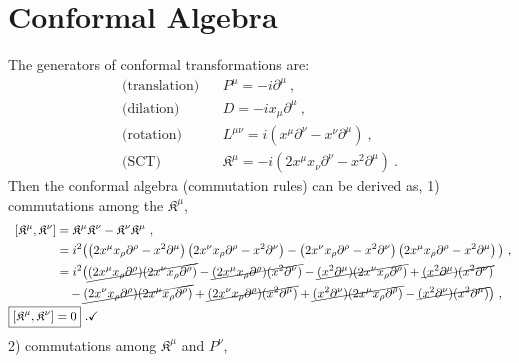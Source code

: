 \documentclass[12pt,a4paper]{report}
\begin{document}
\section{Conformal Algebra}
The generators of conformal transformations are:
\begin{align*}
    \text{(translation)}~~~~&P^{{\mu}}=-i\partial^{{\mu}}~,\\
    \text{(dilation)}~~~~&D=-ix_{{\mu}}\partial^{{\mu}}~,\\
    \text{(rotation)}~~~~&L^{{\mu}{\nu}}=i\left(x^{{\mu}}\partial^{{\nu}}-x^{{\nu}}\partial^{{\mu}}\right)~,\\
    \text{(SCT)}~~~~&\mathfrak{K}^{{\mu}}=-i\left(2x^{{\mu}}x_{{\nu}}\partial^{{\nu}}-x^2\partial^{{\mu}}\right)~.
\end{align*}
Then the conformal algebra (commutation rules) \cite{Antonin, Ralph, Francesco} can be derived as,
1) commutations among the $\mathfrak{K}^{{\mu}}$,
\begin{align*}
    \left[\mathfrak{K}^{{\mu}},\mathfrak{K}^{{\nu}}\right]&=\mathfrak{K}^{{\mu}}\mathfrak{K}^{{\nu}}-\mathfrak{K}^{{\nu}}\mathfrak{K}^{{\mu}}~,\\
    &=i^2\bigl(\left(2x^{{\mu}}x_{{\rho}}\partial^{{\rho}}-x^2\partial^{{\mu}}\right)\left(2x^{{\nu}}x_{{\rho}}\partial^{{\rho}}-x^2\partial^{{\nu}}\right)-\left(2x^{{\nu}}x_{{\rho}}\partial^{{\rho}}-x^2\partial^{{\nu}}\right)\left(2x^{{\mu}}x_{{\rho}}\partial^{{\rho}}-x^2\partial^{{\mu}}\right)\bigl)~,\\
    &=i^2\bigl(\cancel{(2x^{{\mu}}x_{{\rho}}\partial^{{\rho}})(2x^{{\nu}}x_{{\rho}}\partial^{{\rho}})}-\cancel{(2x^{{\mu}}x_{{\rho}}\partial^{{\rho}})(x^2\partial^{{\nu}})}-\cancel{(x^2\partial^{{\mu}})(2x^{{\nu}}x_{{\rho}}\partial^{{\rho}})}+\cancel{(x^2\partial^{{\mu}})(x^2\partial^{{\nu}})}\nonumber\\
    &~~~-\cancel{(2x^{{\nu}}x_{{\rho}}\partial^{{\rho}})(2x^{{\mu}}x_{{\rho}}\partial^{{\rho}})}+\cancel{(2x^{{\nu}}x_{{\rho}}\partial^{{\rho}})(x^2\partial^{{\mu}})}+\cancel{(x^2\partial^{{\nu}})(2x^{{\mu}}x_{{\rho}}\partial^{{\rho}})}-\cancel{(x^2\partial^{{\nu}})(x^2\partial^{{\mu}})}\bigl)~,\\
    \Aboxed{\left[\mathfrak{K}^{{\mu}},\mathfrak{K}^{{\nu}}\right]&=0}~.\checkmark
\end{align*}
2) commutations among $\mathfrak{K}^{{\mu}}$ and $P^{{\nu}}$,
\end{document}
